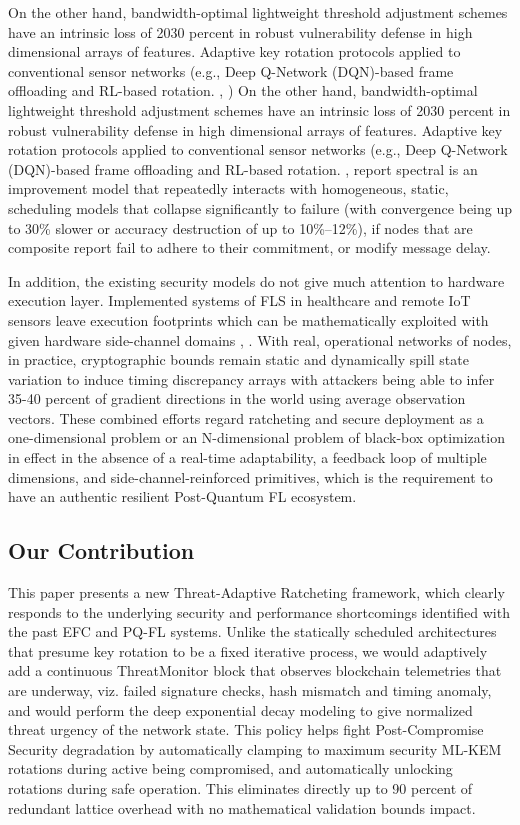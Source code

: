 \documentclass[journal, 10pt, twocolumn]{IEEEtran}
\begin{document}
On the other hand, bandwidth-optimal lightweight threshold adjustment schemes have an intrinsic loss of 2030 percent in robust vulnerability defense in high dimensional arrays of features. Adaptive key rotation protocols applied to conventional sensor networks (e.g., Deep Q-Network (DQN)-based frame offloading and RL-based rotation. \cite{rlrotation1}, \cite{qfluav}) On the other hand, bandwidth-optimal lightweight threshold adjustment schemes have an intrinsic loss of 2030 percent in robust vulnerability defense in high dimensional arrays of features. Adaptive key rotation protocols applied to conventional sensor networks (e.g., Deep Q-Network (DQN)-based frame offloading and RL-based rotation. \cite{bdfll23}, \cite{scalebcfl} report spectral is an improvement model that repeatedly interacts with homogeneous, static, scheduling models that collapse significantly to failure (with convergence being up to 30\% slower or accuracy destruction of up to 10\%--12\%), if nodes that are composite report fail to adhere to their commitment, or modify message delay.
 


In addition, the existing security models do not give much attention to hardware execution layer. Implemented systems of FLS in healthcare and remote IoT sensors leave execution footprints which can be mathematically exploited with given hardware side-channel domains \cite{schealthcare}, \cite{sctrustworthyai}. With real, operational networks of nodes, in practice, cryptographic bounds remain static and dynamically spill state variation to induce timing discrepancy arrays with attackers being able to infer 35-40 percent of gradient directions in the world using average observation vectors. These combined efforts regard ratcheting and secure deployment as a one-dimensional problem or an N-dimensional problem of black-box optimization in effect in the absence of a real-time adaptability, a feedback loop of multiple dimensions, and side-channel-reinforced primitives, which is the requirement to have an authentic resilient Post-Quantum FL ecosystem.

\subsection{Our Contribution}
This paper presents a new Threat-Adaptive Ratcheting framework, which clearly responds to the underlying security and performance shortcomings identified with the past EFC and PQ-FL systems. Unlike the statically scheduled architectures that presume key rotation to be a fixed iterative process, we would adaptively add a continuous ThreatMonitor block that observes blockchain telemetries that are underway, viz. failed signature checks, hash mismatch and timing anomaly, and would perform the deep exponential decay modeling to give normalized threat urgency of the network state. This policy helps fight Post-Compromise Security degradation by automatically clamping to maximum security ML-KEM rotations during active being compromised, and automatically unlocking rotations during safe operation. This eliminates directly up to 90 percent of redundant lattice overhead with no mathematical validation bounds impact.
\end{document}
